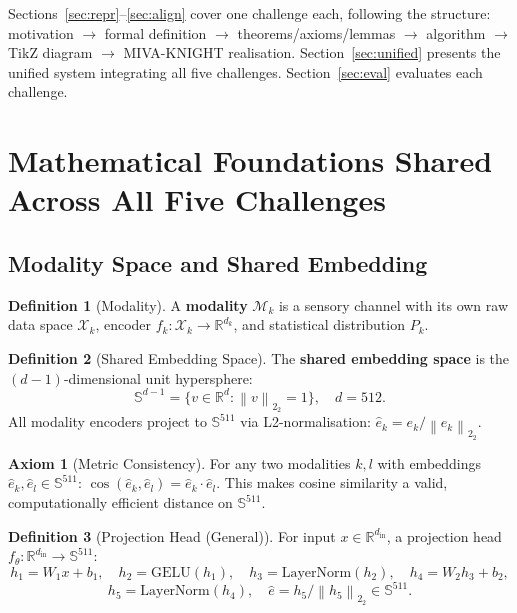 \documentclass[12pt,a4paper]{article}
\theoremstyle{definition}
\newtheorem{definition}{Definition}[section]
\newtheorem{axiom}{Axiom}[section]
\theoremstyle{plain}
\theoremstyle{remark}
\newcommand{\R}{\mathbb{R}}
\newcommand{\Sph}{\mathbb{S}}
\newcommand{\Norm}[1]{\left\|#1\right\|_2}
\newcommand{\LN}{\mathrm{LayerNorm}}
\newcommand{\GELU}{\mathrm{GELU}}
\begin{document}
Sections~\ref{sec:repr}--\ref{sec:align} cover one challenge each, following the structure: motivation $\to$ formal definition $\to$ theorems/axioms/lemmas $\to$ algorithm $\to$ TikZ diagram $\to$ MIVA-KNIGHT realisation. Section~\ref{sec:unified} presents the unified system integrating all five challenges. Section~\ref{sec:eval} evaluates each challenge.

\newpage
\section{Mathematical Foundations Shared Across All Five Challenges}
\label{sec:foundations}

\subsection{Modality Space and Shared Embedding}

\begin{definition}[Modality]
A \textbf{modality} $\mathcal{M}_k$ is a sensory channel with its own raw data space $\mathcal{X}_k$, encoder $f_k : \mathcal{X}_k \to \R^{d_k}$, and statistical distribution $P_k$.
\end{definition}

\begin{definition}[Shared Embedding Space]
The \textbf{shared embedding space} is the $(d{-}1)$-dimensional unit hypersphere:
\[
  \Sph^{d-1} = \{v \in \R^d : \Norm{v}_2 = 1\}, \quad d = 512.
\]
All modality encoders project to $\Sph^{511}$ via L2-normalisation: $\hat{e}_k = e_k / \Norm{e_k}_2$.
\end{definition}

\begin{axiom}[Metric Consistency]
\label{ax:metric}
For any two modalities $k, l$ with embeddings $\hat{e}_k, \hat{e}_l \in \Sph^{511}$:
$\cos(\hat{e}_k, \hat{e}_l) = \hat{e}_k \cdot \hat{e}_l$.
This makes cosine similarity a valid, computationally efficient distance on $\Sph^{511}$.
\end{axiom}

\begin{definition}[Projection Head (General)]
\label{def:projhead}
For input $x \in \R^{d_{\text{in}}}$, a projection head $f_\theta : \R^{d_{\text{in}}} \to \Sph^{511}$:
\[
  h_1 = W_1 x + b_1,\quad h_2 = \GELU(h_1),\quad h_3 = \LN(h_2),\quad h_4 = W_2 h_3 + b_2,
\]
\[
  h_5 = \LN(h_4),\quad \hat{e} = h_5 / \Norm{h_5}_2 \in \Sph^{511}.
\]
\end{definition}
\end{document}
